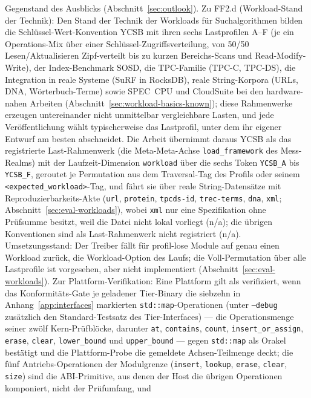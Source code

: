 \begin{nurlang}
Gegenstand des Ausblicks (Abschnitt~\ref{sec:outlook}). Zu FF2.d (Workload-Stand der Technik): Den Stand der Technik der
Workloads für Suchalgorithmen bilden die Schlüssel-Wert-Konvention YCSB mit ihren sechs Lastprofilen
A--F (je ein Operations-Mix über einer Schlüssel-Zugriffsverteilung, von 50/50 Lesen/Aktualisieren
Zipf-verteilt bis zu kurzen Bereichs-Scans und Read-Modify-Write), der Index-Benchmark SOSD, die
TPC-Familie (TPC-C, TPC-DS), die Integration in reale Systeme (SuRF in RocksDB), reale String-Korpora
(URLs, DNA, Wörterbuch-Terme) sowie SPEC~CPU und CloudSuite bei den hardware-nahen Arbeiten
(Abschnitt~\ref{sec:workload-basics-known}); diese Rahmenwerke erzeugen untereinander nicht unmittelbar
vergleichbare Lasten, und jede Veröffentlichung wählt typischerweise das Lastprofil, unter dem ihr
eigener Entwurf am besten abschneidet. Die Arbeit übernimmt daraus YCSB als das registrierte
Last-Rahmenwerk (die Meta-Meta-Achse \texttt{load\_framework} des Mess-Realms) mit der
Laufzeit-Dimension \texttt{workload} über die sechs Token \texttt{YCSB\_A} bis \texttt{YCSB\_F},
geroutet je Permutation aus dem Traversal-Tag des Profils oder seinem
\texttt{<expected\_workload>}-Tag, und fährt sie über reale String-Datensätze mit
Reproduzierbarkeits-Akte (\texttt{url}, \texttt{protein}, \texttt{tpcds-id}, \texttt{trec-terms},
\texttt{dna}, \texttt{xml}; Abschnitt~\ref{sec:eval-workloads}), wobei \texttt{xml} nur eine
Spezifikation ohne Prüfsumme besitzt, weil die Datei nicht lokal vorliegt (n/a); die übrigen
Konventionen sind als Last-Rahmenwerk nicht registriert (n/a). Umsetzungsstand: Der Treiber
fällt für profil-lose Module auf genau einen Workload zurück, die Workload-Option des Laufs; die
Voll-Permutation über alle Lastprofile ist vorgesehen, aber nicht implementiert (Abschnitt~\ref{sec:eval-workloads}). Zur
Plattform-Verifikation: Eine Plattform gilt als verifiziert, wenn das Konformitäts-Gate je
geladener Tier-Binary die siebzehn in Anhang~\ref{app:interfaces}
markierten \texttt{std::map}-Operationen (unter \texttt{--debug} zusätzlich den Standard-Testsatz des
Tier-Interfaces) --- die Operationsmenge seiner zwölf Kern-Prüfblöcke,
darunter \texttt{at}, \texttt{contains}, \texttt{count}, \texttt{insert\_or\_assign}, \texttt{erase},
\texttt{clear}, \texttt{lower\_bound} und \texttt{upper\_bound} --- gegen \texttt{std::map} als Orakel
bestätigt und die Plattform-Probe die gemeldete Achsen-Teilmenge deckt; die fünf Antriebs-Operationen
der Modulgrenze (\texttt{insert}, \texttt{lookup}, \texttt{erase}, \texttt{clear}, \texttt{size}) sind
die ABI-Primitive, aus denen der Host die übrigen Operationen komponiert, nicht der Prüfumfang, und

\end{nurlang}
